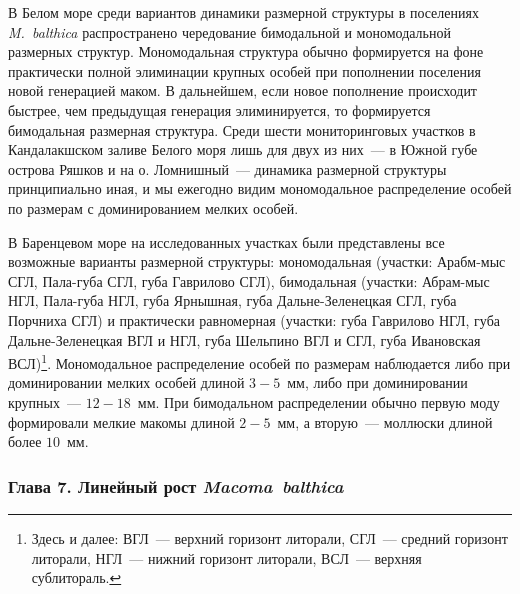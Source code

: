 {В Белом море среди вариантов динамики размерной структуры в поселениях {\it M.~balthica} распространено чередование бимодальной и мономодальной размерных структур.
Мономодальная структура обычно формируется на фоне практически полной элиминации крупных особей при пополнении поселения новой генерацией маком.
В дальнейшем, если новое пополнение происходит быстрее, чем предыдущая генерация элиминируется, то формируется бимодальная размерная структура.
Среди шести мониторинговых участков в Кандалакшском заливе Белого моря лишь для двух из них~--- в Южной губе острова Ряшков и на о. Ломнишный~--- динамика размерной структуры принципиально иная, и мы ежегодно видим мономодальное распределение особей по размерам с доминированием мелких особей.

В Баренцевом море на исследованных участках были представлены все возможные варианты размерной структуры: мономодальная (участки: Арабм-мыс СГЛ, Пала-губа СГЛ, губа Гаврилово СГЛ), бимодальная (участки: Абрам-мыс НГЛ, Пала-губа НГЛ, губа Ярнышная, губа Дальне-Зеленецкая СГЛ, губа Порчниха СГЛ) и практически равномерная (участки: губа Гаврилово НГЛ, губа Дальне-Зеленецкая ВГЛ и НГЛ, губа Шельпино ВГЛ и СГЛ, губа Ивановская ВСЛ)\footnote{Здесь и далее: ВГЛ~--- верхний горизонт литорали, СГЛ~--- средний горизонт литорали, НГЛ~--- нижний горизонт литорали, ВСЛ~--- верхняя сублитораль.}. 
Мономодальное распределение особей по размерам наблюдается либо при доминировании мелких особей длиной $3-5$~мм, либо при доминировании крупных~--- $12-18$~мм.
При бимодальном распределении обычно первую моду формировали мелкие макомы длиной $2-5$~мм, а вторую~--- моллюски длиной более $10$~мм.



\subsubsection*{Глава 7. Линейный рост \textit{Macoma~balthica}}

}
